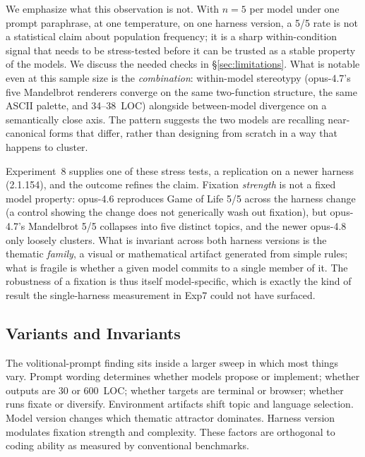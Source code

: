 \documentclass{article}
\begin{document}
We emphasize what this observation is not. With $n=5$ per
model under one prompt paraphrase, at one temperature, on one
harness version, a 5/5 rate is not a statistical claim about
population frequency; it is a sharp within-condition signal
that needs to be stress-tested before it can be trusted as a
stable property of the models. We discuss the needed checks
in \S\ref{sec:limitations}. What is notable even at this
sample size is the \emph{combination}: within-model
stereotypy (opus-4.7's five Mandelbrot renderers converge on
the same two-function structure, the same ASCII palette, and
34--38~LOC) alongside between-model divergence on a
semantically close axis. The pattern suggests the two models
are recalling near-canonical forms that differ, rather than
designing from scratch in a way that happens to cluster.

Experiment~8 supplies one of these stress tests, a replication
on a newer harness (2.1.154), and the outcome refines the
claim. Fixation \emph{strength} is not a fixed model property:
opus-4.6 reproduces Game of Life 5/5 across the harness change
(a control showing the change does not generically wash out
fixation), but opus-4.7's Mandelbrot 5/5 collapses into five
distinct topics, and the newer opus-4.8 only loosely clusters.
What is invariant across both harness versions is the thematic
\emph{family}, a visual or mathematical artifact generated from
simple rules; what is fragile is whether a given model commits
to a single member of it. The robustness of a fixation is thus
itself model-specific, which is exactly the kind of result the
single-harness measurement in Exp7 could not have surfaced.

\subsection{Variants and Invariants}

The volitional-prompt finding sits inside a larger sweep in
which most things vary. Prompt wording determines whether
models propose or implement; whether outputs are 30 or
600~LOC; whether targets are terminal or browser; whether
runs fixate or diversify. Environment artifacts shift topic
and language selection. Model version changes which
thematic attractor dominates. Harness version modulates
fixation strength and complexity. These factors are
orthogonal to coding ability as measured by conventional
benchmarks.
\end{document}
